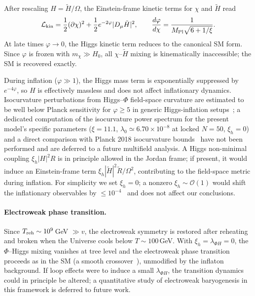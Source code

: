 \documentclass[pdflatex,sn-mathphys-num]{sn-jnl}
\newcommand{\MP}{M_{\rm Pl}}
\theoremstyle{thmstyleone}
\begin{document}
After rescaling $H=\tilde H/\Omega$, the Einstein-frame kinetic terms for $\chi$ and $\tilde H$ read
\begin{equation}
\mathcal{L}_{\rm kin}=\frac12(\partial\chi)^2+\frac12 e^{-2\varphi}|D_\mu\tilde H|^2,
\qquad
\frac{d\varphi}{d\chi}=\frac{1}{\MP\sqrt{6+1/\xi}}.
\label{eq:LkinH}
\end{equation}
At late times $\varphi\to0$, the Higgs kinetic term reduces to the canonical SM form. Since $\varphi$ is frozen with $m_\chi\gg H_0$, all $\chi$--$\tilde H$ mixing is kinematically inaccessible; the SM is recovered exactly.

During inflation ($\varphi\gg1$), the Higgs mass term is exponentially suppressed by $e^{-4\varphi}$, so $H$ is effectively massless and does not affect inflationary dynamics. Isocurvature perturbations from Higgs--$\Phi$ field-space curvature are estimated to be well below Planck sensitivity for $\varphi\geq5$ in generic Higgs-inflation setups~\cite{Markkanen2018}; a dedicated computation of the isocurvature power spectrum for the present model's specific parameters ($\xi=11.1$, $\lambda_0\simeq6.70\times10^{-8}$ at locked $N=50$, $\xi_h=0$) and a direct comparison with Planck 2018 isocurvature bounds~\cite{Planck2018} have not been performed and are deferred to a future multifield analysis. A Higgs non-minimal coupling $\xi_h|H|^2R$ is in principle allowed in the Jordan frame; if present, it would induce an Einstein-frame term $\xi_h|\tilde H|^2\tilde R/\Omega^2$, contributing to the field-space metric during inflation. For simplicity we set $\xi_h=0$; a nonzero $\xi_h\sim\mathcal{O}(1)$ would shift the inflationary observables by $\leq10^{-4}$~\cite{Bezrukov2008} and does not affect our conclusions.

\paragraph{Electroweak phase transition.} Since $T_{\rm reh}\sim10^9\,$GeV $\gg v$, the electroweak symmetry is restored after reheating and broken when the Universe cools below $T\sim100\,$GeV. With $\xi_h=\lambda_{\Phi H}=0$, the $\Phi$--Higgs mixing vanishes at tree level and the electroweak phase transition proceeds as in the SM (a smooth crossover~\cite{Kajantie1996}), unmodified by the inflaton background. If loop effects were to induce a small $\lambda_{\Phi H}$, the transition dynamics could in principle be altered; a quantitative study of electroweak baryogenesis in this framework is deferred to future work.
\end{document}
